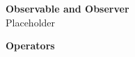 






\textbf{Observable and Observer}\\
Placeholder

\textbf{Operators}
\label{subsec:Operators}\\


